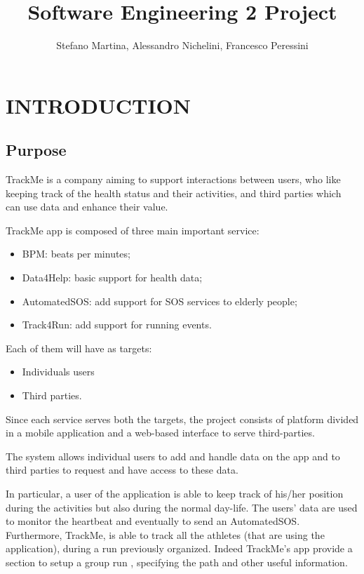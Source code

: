 \documentclass{article}
\title{Software Engineering 2 Project}
\author{Stefano Martina, Alessandro Nichelini, Francesco Peressini}
\begin{document}
\maketitle

\section{INTRODUCTION}

\subsection{Purpose}

TrackMe is a company aiming to support interactions between users, who like keeping track of the health status and their activities, and third parties which can use data and enhance their value.

TrackMe app is composed of three main important service:
\begin{itemize}
\item BPM: beats per minutes;
\item Data4Help: basic support for health data;
\item AutomatedSOS: add support for SOS services to elderly people;
\item Track4Run: add support for running events.
\end{itemize}

Each of them will have as targets:
\begin{itemize}
\item Individuals users
\item Third parties.
\end{itemize}
Since each service serves both the targets, the project consists of platform divided in a mobile application and a web-based interface to serve third-parties.

The system allows individual users to add and handle data on the app and to third parties to request and have access to these data.

In particular, a user of the application is able to keep track of his/her position during the activities but also during the normal day-life. The users’ data are used to monitor the heartbeat and eventually to send an AutomatedSOS.
Furthermore, TrackMe, is able to track all the athletes (that are using the application), during a run previously organized. Indeed TrackMe’s app provide a section to setup a group run , specifying the path and other useful information.
\end{document}

